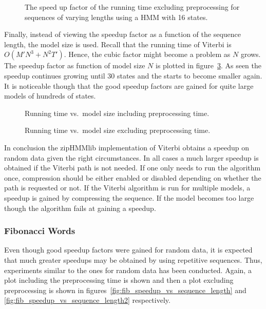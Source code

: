\begin{figure}
  \centering
  
  \caption{The speed up factor of the running time excluding preprocessing for
    sequences of varying lengths using a HMM with 16 states.}
  \label{fig:speedup_vs_sequence_length2}
\end{figure}

Finally, instead of viewing the speedup factor as a function of the sequence
length, the model size is used. Recall that the running time of Viterbi is
$O(M' N^3 + N^2 T')$. Hence, the cubic factor might become a problem as $N$
grows. The speedup factor as function of model size $N$ is plotted in
figure~\ref{fig:speedup_vs_k}. As seen the speedup continues growing until 30
states and the starts to become smaller again. It is noticeable though that the
good speedup factors are gained for quite large models of hundreds of states.

\begin{figure}
  \centering
  
  \caption{Running time vs.\ model size including preprocessing time.}
  \label{fig:speedup_vs_k}
\end{figure}

\begin{figure}
  \centering
  
  \caption{Running time vs.\ model size excluding preprocessing time.}
  \label{fig:speedup_vs_k}
\end{figure}

In conclusion the zipHMMlib implementation of Viterbi obtains a speedup on
random data given the right circumstances. In all cases a much larger speedup
is obtained if the Viterbi path is not needed. If one only needs to run the
algorithm once, compression should be either enabled or disabled depending on
whether the path is requested or not. If the Viterbi algorithm is run for
multiple models, a speedup is gained by compressing the sequence. If the model
becomes too large though the algorithm fails at gaining a speedup.

\subsubsection{Fibonacci Words}
\label{sec:fibonacci-words-1}

Even though good speedup factors were gained for random data, it is expected
that much greater speedups may be obtained by using repetitive
sequences. Thus, experiments similar to the ones for random data has been
conducted. Again, a plot including the preprocessing time is shown and then a
plot excluding preprocessing is shown in
figures~\ref{fig:fib_speedup_vs_sequence_length} and
\ref{fig:fib_speedup_vs_sequence_length2} respectively.

